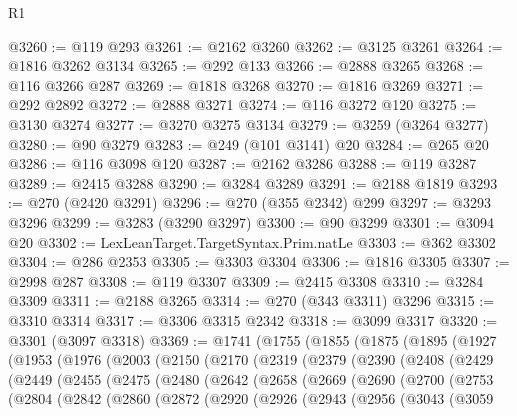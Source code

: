 \begin{lexlean}{R1}
\begin{coremodule}
@3260 := @119 @293
@3261 := @2162 @3260
@3262 := @3125 @3261
@3264 := @1816 @3262 @3134
@3265 := @292 @133
@3266 := @2888 @3265
@3268 := @116 @3266 @287
@3269 := @1818 @3268
@3270 := @1816 @3269
@3271 := @292 @2892
@3272 := @2888 @3271
@3274 := @116 @3272 @120
@3275 := @3130 @3274
@3277 := @3270 @3275 @3134
@3279 := @3259 (@3264 @3277)
@3280 := @90 @3279
@3283 := @249 (@101 @3141) @20
@3284 := @265 @20
@3286 := @116 @3098 @120
@3287 := @2162 @3286
@3288 := @119 @3287
@3289 := @2415 @3288
@3290 := @3284 @3289
@3291 := @2188 @1819
@3293 := @270 (@2420 @3291)
@3296 := @270 (@355 @2342) @299
@3297 := @3293 @3296
@3299 := @3283 (@3290 @3297)
@3300 := @90 @3299
@3301 := @3094 @20
@3302 := LexLeanTarget.TargetSyntax.Prim.natLe
@3303 := @362 @3302
@3304 := @286 @2353
@3305 := @3303 @3304
@3306 := @1816 @3305
@3307 := @2998 @287
@3308 := @119 @3307
@3309 := @2415 @3308
@3310 := @3284 @3309
@3311 := @2188 @3265
@3314 := @270 (@343 @3311) @3296
@3315 := @3310 @3314
@3317 := @3306 @3315 @2342
@3318 := @3099 @3317
@3320 := @3301 (@3097 @3318)
@3369 := @1741
    (@1755
      (@1855
        (@1875
          (@1895
            (@1927
              (@1953
                (@1976
                  (@2003
                    (@2150
                      (@2170
                        (@2319
                          (@2379
                            (@2390
                              (@2408
                                (@2429
                                  (@2449
                                    (@2455
                                      (@2475
                                        (@2480
                                          (@2642
                                            (@2658
                                              (@2669
                                                (@2690
                                                  (@2700
                                                    (@2753
                                                      (@2804
                                                        (@2842
                                                          (@2860
                                                            (@2872
                                                              (@2920
                                                                (@2926
                                                                  (@2943
                                                                    (@2956
                                                                      (@3043
                                                                        (@3059

\end{coremodule}
\end{lexlean}
